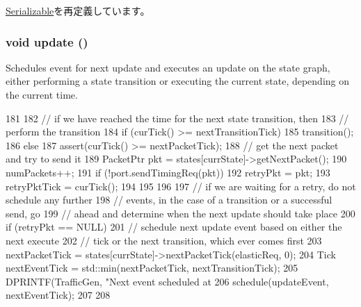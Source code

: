 \hyperlink{classSerializable_af100c4e9feabf3cd918619c88c718387}{Serializable}を再定義しています。\hypertarget{classTrafficGen_ac5c54df7ed3b930268c8d7752c101725}{
\subsubsection[{update}]{\setlength{\rightskip}{0pt plus 5cm}void update ()}}
\label{classTrafficGen_ac5c54df7ed3b930268c8d7752c101725}
Schedules event for next update and executes an update on the state graph, either performing a state transition or executing the current state, depending on the current time. 


\begin{DoxyCode}
181 {
182     // if we have reached the time for the next state transition, then
183     // perform the transition
184     if (curTick() >= nextTransitionTick) {
185         transition();
186     } else {
187         assert(curTick() >= nextPacketTick);
188         // get the next packet and try to send it
189         PacketPtr pkt = states[currState]->getNextPacket();
190         numPackets++;
191         if (!port.sendTimingReq(pkt)) {
192             retryPkt = pkt;
193             retryPktTick = curTick();
194         }
195     }
196 
197     // if we are waiting for a retry, do not schedule any further
198     // events, in the case of a transition or a successful send, go
199     // ahead and determine when the next update should take place
200     if (retryPkt == NULL) {
201         // schedule next update event based on either the next execute
202         // tick or the next transition, which ever comes first
203         nextPacketTick = states[currState]->nextPacketTick(elasticReq, 0);
204         Tick nextEventTick = std::min(nextPacketTick, nextTransitionTick);
205         DPRINTF(TrafficGen, "Next event scheduled at %
206         schedule(updateEvent, nextEventTick);
207     }
208 }
\end{DoxyCode}


